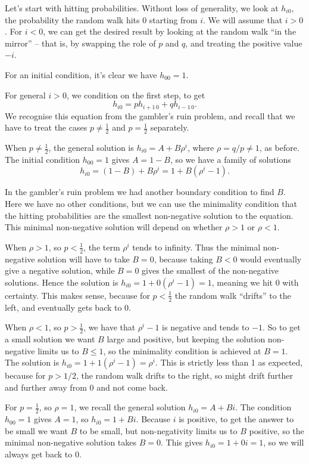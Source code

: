 \documentclass[
  a4paper,
]{article}
\theoremstyle{definition}
\theoremstyle{definition}
\theoremstyle{definition}
\theoremstyle{remark}
\begin{document}
Let's start with hitting probabilities. Without loss of generality, we look at \(h_{i0}\), the probability the random walk hits 0 starting from \(i\).
We will assume that \(i > 0\). For \(i < 0\), we can get the desired result by looking at the random walk ``in the mirror'' -- that is, by swapping the role of \(p\) and \(q\), and treating the positive value \(-i\).

For an initial condition, it's clear we have \(h_{00} = 1\).

For general \(i > 0\), we condition on the first step, to get
\[ h_{i0} = ph_{i+1\, 0} + qh_{i-1\, 0} .  \]
We recognise this equation from the gambler's ruin problem, and recall that we have to treat the cases \(p \neq \frac12\) and \(p = \frac12\) separately.

When \(p \neq \frac12\), the general solution is \(h_{i0} = A + B\rho^i\), where \(\rho = q/p \neq 1\), as before. The initial condition \(h_{00} = 1\) gives \(A = 1-B\), so we have a family of solutions
\[ h_{i0} = (1 - B) + B\rho^i = 1 + B(\rho^i - 1) . \]

In the gambler's ruin problem we had another boundary condition to find \(B\). Here we have no other conditions, but we can use the minimality condition that the hitting probabilities are the smallest non-negative solution to the equation. This minimal non-negative solution will depend on whether \(\rho > 1\) or \(\rho < 1\).

When \(\rho > 1\), so \(p < \frac12\), the term \(\rho^i\) tends to infinity. Thus the minimal non-negative solution will have to take \(B = 0\), because taking \(B < 0\) would eventually give a negative solution, while \(B = 0\) gives the smallest of the non-negative solutions. Hence the solution is \(h_{i0} = 1 + 0(\rho^i-1) = 1\), meaning we hit 0 with certainty. This makes sense, because for \(p < \frac12\) the random walk ``drifts'' to the left, and eventually gets back to 0.

When \(\rho < 1\), so \(p > \frac12\), we have that \(\rho^i - 1\) is negative and tends to \(-1\). So to get a small solution we want \(B\) large and positive, but keeping the solution non-negative limits us to \(B \leq 1\), so the minimality condition is achieved at \(B = 1\). The solution is \(h_{i0} = 1 + 1(\rho^i - 1) = \rho^i\). This is strictly less than 1 as expected, because for \(p > 1/2\), the random walk drifts to the right, so might drift further and further away from 0 and not come back.

For \(p = \frac12\), so \(\rho = 1\), we recall the general solution \(h_{i0} = A + Bi\). The condition \(h_{00} = 1\) gives \(A = 1\), so \(h_{i0} = 1 + Bi\). Because \(i\) is positive, to get the answer to be small we want \(B\) to be small, but non-negativity limits us to \(B\) positive, so the minimal non-negative solution takes \(B = 0\). This gives \(h_{i0} = 1 + 0i = 1\), so we will always get back to 0.
\end{document}
